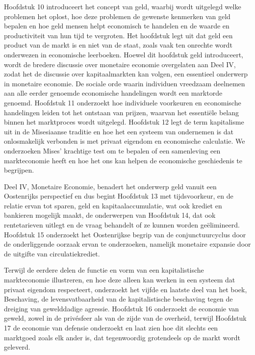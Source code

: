 Hoofdstuk 10 introduceert het concept van geld, waarbij wordt uitgelegd welke problemen het oplost, hoe deze problemen de gewenste kenmerken van geld bepalen en hoe geld mensen helpt economisch te handelen en de waarde en productiviteit van hun tijd te vergroten. Het hoofdstuk legt uit dat geld een product van de markt is en niet van de staat, zoals vaak ten onrechte wordt onderwezen in economische leerboeken. Hoewel dit hoofdstuk geld introduceert, wordt de bredere discussie over monetaire economie overgelaten aan Deel IV, zodat het de discussie over kapitaalmarkten kan volgen, een essentieel onderwerp in monetaire economie.
De sociale orde waarin individuen vreedzaam deelnemen aan alle eerder genoemde economische handelingen wordt een marktorde genoemd. Hoofdstuk 11 onderzoekt hoe individuele voorkeuren en economische handelingen leiden tot het ontstaan van prijzen, waarvan het essentiële belang binnen het marktproces wordt uitgelegd. Hoofdstuk 12 legt de term kapitalisme uit in de Misesiaanse traditie en hoe het een systeem van ondernemen is dat onlosmakelijk verbonden is met privaat eigendom en economische calculatie. We onderzoeken Mises' krachtige test om te bepalen of een samenleving een markteconomie heeft en hoe het ons kan helpen de economische geschiedenis te begrijpen.

Deel IV, Monetaire Economie, benadert het onderwerp geld vanuit een Oostenrijks perspectief en dus begint Hoofdstuk 13 met tijdsvoorkeur, en de relatie ervan tot sparen, geld en kapitaalaccumulatie, wat ook krediet en bankieren mogelijk maakt, de onderwerpen van Hoofdstuk 14, dat ook rentetarieven uitlegt en de vraag behandelt of ze kunnen worden geëlimineerd. Hoofdstuk 15 onderzoekt het Oostenrijkse begrip van de conjunctuurcyclus door de onderliggende oorzaak ervan te onderzoeken, namelijk monetaire expansie door de uitgifte van circulatiekrediet.

Terwijl de eerdere delen de functie en vorm van een kapitalistische markteconomie illustreren, en hoe deze alleen kan werken in een systeem dat privaat eigendom respecteert, onderzoekt het vijfde en laatste deel van het boek, Beschaving, de levensvatbaarheid van de kapitalistische beschaving tegen de dreiging van gewelddadige agressie. Hoofdstuk 16 onderzoekt de economie van geweld, zowel in de privésfeer als van de zijde van de overheid, terwijl Hoofdstuk 17 de economie van defensie onderzoekt en laat zien hoe dit slechts een marktgoed zoals elk ander is, dat tegenwoordig grotendeels op de markt wordt geleverd.

